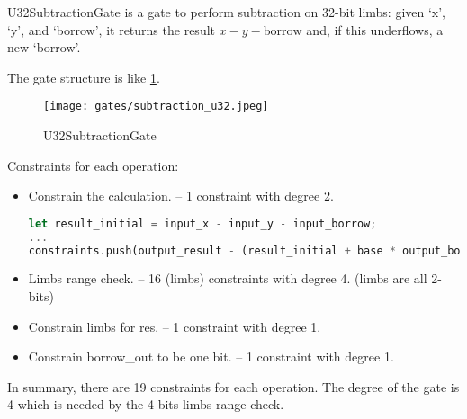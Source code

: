 
\hspace*{\fill}

\indent U32SubtractionGate is a gate to perform subtraction on 32-bit limbs: given `x', `y', and `borrow', it returns 
the result $x - y - \text{borrow}$ and, if this underflows, a new `borrow'.

The gate structure is like \ref{fig:subtraction-u32}.

\begin{figure}[!ht]
    \centering
    \texttt{[image: gates/subtraction\_u32.jpeg]}
    \caption{U32SubtractionGate}
    \label{fig:subtraction-u32}
\end{figure}

Constraints for each operation:
\begin{itemize}
    \item Constrain the calculation. -- 1 constraint with degree 2.
    \begin{lstlisting}[language=rust]
let result_initial = input_x - input_y - input_borrow;
...
constraints.push(output_result - (result_initial + base * output_borrow));
    \end{lstlisting}
    \item Limbs range check. -- 16 (limbs) constraints with degree 4. (limbs are all 2-bits)
    \item Constrain limbs for res. -- 1 constraint with degree 1.
    \item Constrain borrow\_out to be one bit. -- 1 constraint with degree 1.
\end{itemize}

In summary, there are 19 constraints for each operation. The degree of the gate is 4 which is needed by the 4-bits limbs range check.
